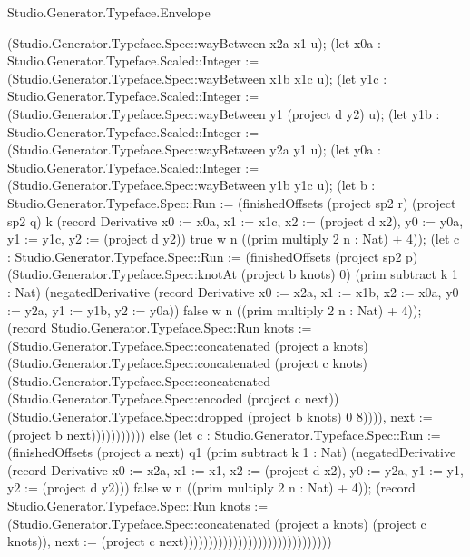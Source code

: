 \begin{lexlean}{Studio.Generator.Typeface.Envelope}
\begin{semanticmodule}
{(Studio.Generator.Typeface.Spec::wayBetween x2a x1 u); (let x0a : Studio.Generator.Typeface.Scaled::Integer := (Studio.Generator.Typeface.Spec::wayBetween x1b x1c u); (let y1c : Studio.Generator.Typeface.Scaled::Integer := (Studio.Generator.Typeface.Spec::wayBetween y1 (project d y2) u); (let y1b : Studio.Generator.Typeface.Scaled::Integer := (Studio.Generator.Typeface.Spec::wayBetween y2a y1 u); (let y0a : Studio.Generator.Typeface.Scaled::Integer := (Studio.Generator.Typeface.Spec::wayBetween y1b y1c u); (let b : Studio.Generator.Typeface.Spec::Run := (finishedOffsets (project sp2 r) (project sp2 q) k (record Derivative {x0 := x0a, x1 := x1c, x2 := (project d x2), y0 := y0a, y1 := y1c, y2 := (project d y2)}) true w n ((prim multiply 2 n : Nat) + 4)); (let c : Studio.Generator.Typeface.Spec::Run := (finishedOffsets (project sp2 p) (Studio.Generator.Typeface.Spec::knotAt (project b knots) 0) (prim subtract k 1 : Nat) (negatedDerivative (record Derivative {x0 := x2a, x1 := x1b, x2 := x0a, y0 := y2a, y1 := y1b, y2 := y0a})) false w n ((prim multiply 2 n : Nat) + 4)); (record Studio.Generator.Typeface.Spec::Run {knots := (Studio.Generator.Typeface.Spec::concatenated (project a knots) (Studio.Generator.Typeface.Spec::concatenated (project c knots) (Studio.Generator.Typeface.Spec::concatenated (Studio.Generator.Typeface.Spec::encoded (project c next)) (Studio.Generator.Typeface.Spec::dropped (project b knots) 0 8)))), next := (project b next)})))))))))) else (let c : Studio.Generator.Typeface.Spec::Run := (finishedOffsets (project a next) q1 (prim subtract k 1 : Nat) (negatedDerivative (record Derivative {x0 := x2a, x1 := x1, x2 := (project d x2), y0 := y2a, y1 := y1, y2 := (project d y2)})) false w n ((prim multiply 2 n : Nat) + 4)); (record Studio.Generator.Typeface.Spec::Run {knots := (Studio.Generator.Typeface.Spec::concatenated (project a knots) (project c knots)), next := (project c next)})))))))))))))))))))))))))))))
}


\end{semanticmodule}
\end{lexlean}

